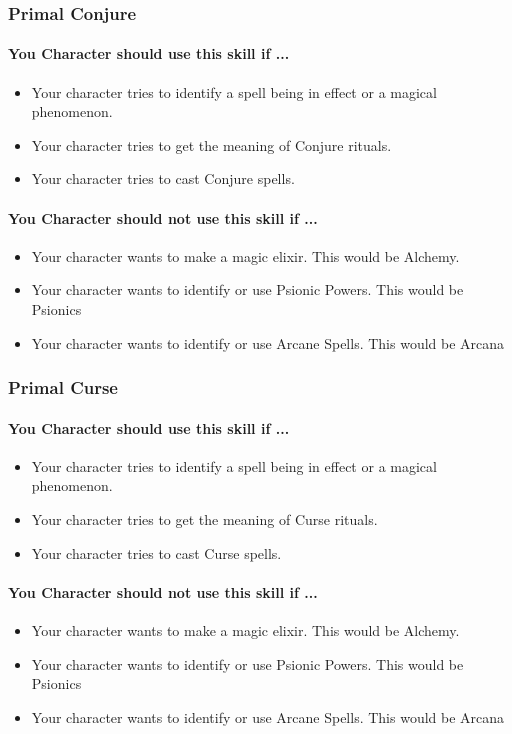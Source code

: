 \begin{multicols}{2}
\subsubsection{Primal Conjure}\label{skill:primal_conjure}
\paragraph{You Character should use this skill if ...}
\begin{itemize}
    \item Your character tries to identify a spell being in effect or a magical
        phenomenon.
    \item Your character tries to get the meaning of Conjure rituals.
    \item Your character tries to cast Conjure spells.
\end{itemize}
\paragraph{You Character should not use this skill if ...}
\begin{itemize}
    \item Your character wants to make a magic elixir.  This would be Alchemy.
    \item Your character wants to identify or use Psionic Powers. This would be
        Psionics
    \item Your character wants to identify or use Arcane Spells. This would be
        Arcana
\end{itemize}

\subsubsection{Primal Curse}\label{skill:primal_curse}
\paragraph{You Character should use this skill if ...}
\begin{itemize}
    \item Your character tries to identify a spell being in effect or a magical
        phenomenon.
    \item Your character tries to get the meaning of Curse rituals.
    \item Your character tries to cast Curse spells.
\end{itemize}
\paragraph{You Character should not use this skill if ...}
\begin{itemize}
    \item Your character wants to make a magic elixir.  This would be Alchemy.
    \item Your character wants to identify or use Psionic Powers. This would be
        Psionics
    \item Your character wants to identify or use Arcane Spells. This would be
        Arcana
\end{itemize}


\end{multicols}
